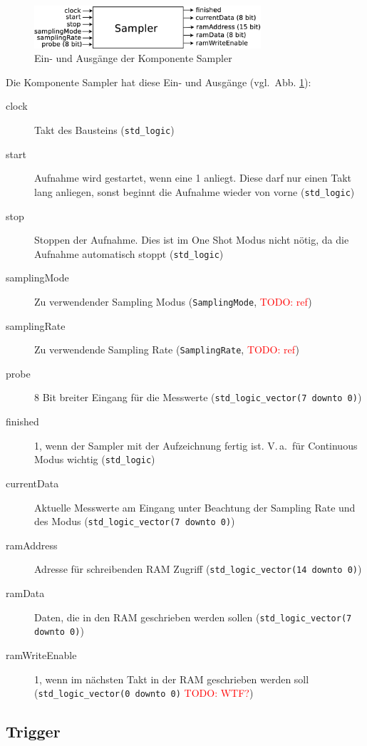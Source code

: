 \documentclass[IN,ngerman,utf8,12pt]{tumbook}
\newcommand\todo[1]{\textcolor{red}{TODO: #1}}
\newcommand{\vgl}{vgl.\ }
\newcommand{\Va}{V.\,a.\ }
\begin{document}
\begin{figure}[H]
    \centerline{
        \includegraphics[width=0.75\textwidth]{img/sampler}
    }
    \label{abb:sampler}
    \caption{Ein- und Ausgänge der Komponente Sampler}
\end{figure}

Die Komponente Sampler hat diese Ein- und Ausgänge (\vgl Abb. \ref{abb:sampler}):
\begin{description}
    \item[clock] Takt des Bausteins (\texttt{std\_logic})
    \item[start] Aufnahme wird gestartet, wenn eine 1 anliegt. Diese darf nur einen Takt lang anliegen, sonst beginnt die Aufnahme wieder von vorne (\texttt{std\_logic})
    \item[stop] Stoppen der Aufnahme. Dies ist im One Shot Modus nicht nötig, da die Aufnahme automatisch stoppt (\texttt{std\_logic})
    \item[samplingMode] Zu verwendender Sampling Modus (\texttt{SamplingMode}, \todo{ref})
    \item[samplingRate] Zu verwendende Sampling Rate (\texttt{SamplingRate}, \todo{ref})
    \item[probe] 8 Bit breiter Eingang für die Messwerte (\texttt{std\_logic\_vector(7 downto 0)})
    \item[finished] 1, wenn der Sampler mit der Aufzeichnung fertig ist. \Va für Continuous Modus wichtig (\texttt{std\_logic})
    \item[currentData] Aktuelle Messwerte am Eingang unter Beachtung der Sampling Rate und des Modus (\texttt{std\_logic\_vector(7 downto 0)})
    \item[ramAddress] Adresse für schreibenden RAM Zugriff (\texttt{std\_logic\_vector(14 downto 0)})
    \item[ramData] Daten, die in den RAM geschrieben werden sollen (\texttt{std\_logic\_vector(7 downto 0)})
    \item[ramWriteEnable] 1, wenn im nächsten Takt in der RAM geschrieben werden soll (\texttt{std\_logic\_vector(0 downto 0)} \todo{WTF?})
\end{description}

\subsection{Trigger}
\end{document}
